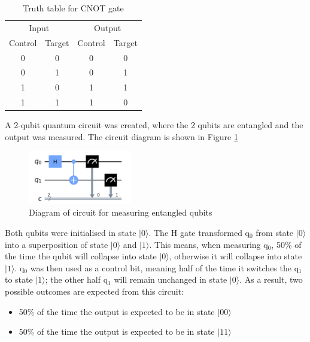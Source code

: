 \begin{table}[h]
\centering
\begin{tabular}{cccc}
\multicolumn{2}{c}{Input}                         & \multicolumn{2}{c}{Output}   \\ 
\multicolumn{1}{c|}{Control} & \multicolumn{1}{c||}{Target} & \multicolumn{1}{c|}{Control} & Target \\ \hline\hline
\multicolumn{1}{c|}{0}  & \multicolumn{1}{c||}{0}  & \multicolumn{1}{c|}{0}  & 0  \\ \hline
\multicolumn{1}{c|}{0}  & \multicolumn{1}{c||}{1}  & \multicolumn{1}{c|}{0}  & 1  \\ \hline
\multicolumn{1}{c|}{1}  & \multicolumn{1}{c||}{0}  & \multicolumn{1}{c|}{1}  & 1  \\ \hline
\multicolumn{1}{c|}{1}  & \multicolumn{1}{c||}{1}  & \multicolumn{1}{c|}{1}  & 0 
\end{tabular}
\label{tab:cNotTruth}
\caption{Truth table for CNOT gate}
\end{table}

A 2-qubit quantum circuit was created, where the 2 qubits are entangled and the output was measured. The circuit diagram is shown in Figure \ref{fig:entangleMeasure}

\begin{figure}[h]
    \centering
    \includegraphics[width=0.4\textwidth]{lab2/images/entangleMeasure.png}
    \caption{Diagram of circuit for measuring entangled qubits} 
    \label{fig:entangleMeasure}
\end{figure}

Both qubits were initialised in state $|0\rangle$. The H gate transformed q$_0$ from state $|0\rangle$ into a superposition of state $|0\rangle$ and $|1\rangle$. This means, when measuring q$_0$, 50\% of the time the qubit will collapse into state $|0\rangle$, otherwise it will collapse into state $|1\rangle$. q$_0$ was then used as a control bit, meaning half of the time it switches the q$_1$ to state $|1\rangle$; the other half q$_1$ will remain unchanged in state $|0\rangle$. As a result, two possible outcomes are expected from this circuit:
\begin{itemize}
    \item 50\% of the time the output is expected to be in state $|00\rangle$
    \item 50\% of the time the output is expected to be in state $|11\rangle$
\end{itemize}

